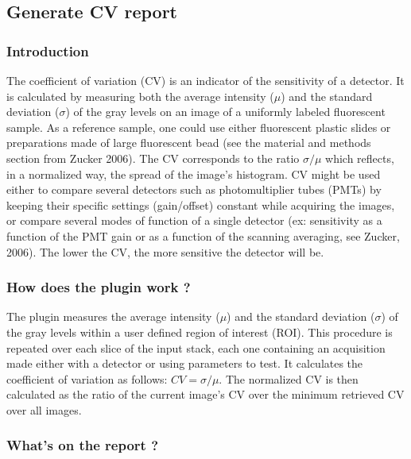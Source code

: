 \documentclass[]{spie}
\begin{document}
\subsection{Generate CV report}
\label{subsec:gcvr}

\subsubsection*{Introduction}
\label{subsubsec:gcvr-intro}

The coefficient of variation (CV) is an indicator of the sensitivity of a detector. It is calculated by measuring both the average intensity ($\mu$) and the standard deviation ($\sigma$) of the gray levels on an image of a uniformly labeled fluorescent sample. As a reference sample, one could use either fluorescent plastic slides or preparations made of large fluorescent bead (see the material and methods section from Zucker 2006\cite{Zucker2006}). The CV corresponds to the ratio $\sigma/\mu$ which reflects, in a normalized way, the spread of the image's histogram. CV might be used either to compare several detectors such as photomultiplier tubes (PMTs) by keeping their specific settings (gain/offset) constant while acquiring the images, or compare several modes of function of a single detector (ex: sensitivity as a function of the PMT gain or as a function of the scanning averaging, see Zucker, 2006\cite{Zucker2006}). The lower the CV, the more sensitive the detector will be.

\subsubsection*{How does the plugin work ?}
\label{subsubsec:gcvr-pgWork}

The plugin measures the average intensity ($\mu$) and the standard deviation ($\sigma$) of the gray levels within a user defined region of interest (ROI). This procedure is repeated over each slice of the input stack, each one containing an acquisition made either with a detector or using parameters to test. It calculates the coefficient of variation as follows: $CV = \sigma/\mu$. The normalized CV is then calculated as the ratio of the current image's CV over the minimum retrieved CV over all images.

\subsubsection{What's on the report ?}
\label{sec:gcvr-report}
\end{document}
